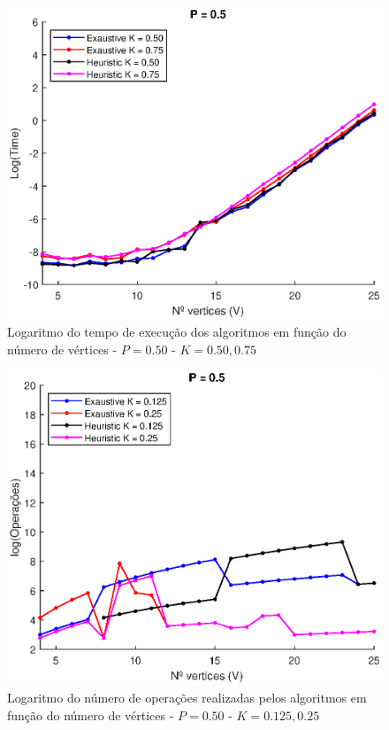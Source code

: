 \documentclass{revdetua}
\begin{document}
\begin{figure}[h!]
\centering
\includegraphics[scale = 0.5]{Figs/2_P050.eps}
\caption{Logaritmo do tempo de execução dos algoritmos em função do número de vértices - $P = 0.50$ - $K = 0.50, 0.75$}
\label{2_P050}
\end{figure}

\begin{figure}[h!]
\centering
\includegraphics[scale = 0.5]{Figs/3_P050.eps}
\caption{Logaritmo do número de operações realizadas pelos algoritmos em função do número de vértices - $P = 0.50$ - $K = 0.125, 0.25$}
\label{3_P050}
\end{figure}
\end{document}
